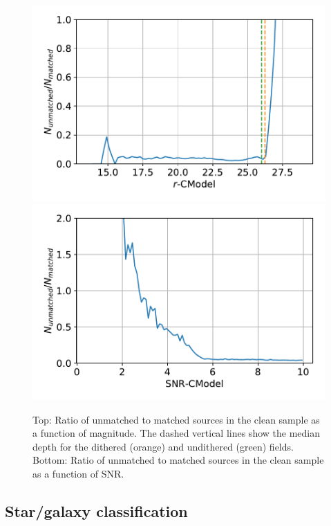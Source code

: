 \documentclass[\docopts]{\docclass}
\begin{document}
\begin{figure}
\centering
\includegraphics[width=0.9\columnwidth]{unmatched_fraction_magnitude.pdf}
\includegraphics[width=0.9\columnwidth]{unmatched_fraction_SNR.pdf}
\caption{Top: Ratio of unmatched to matched sources in the clean sample as a function of magnitude. The dashed vertical lines show the median depth for the dithered (orange) and undithered (green) fields. Bottom: Ratio of unmatched to matched sources in the clean sample as a function of SNR.}
\label{fig:snr_mag_selection}
\end{figure}

\subsection{Star/galaxy classification}
\end{document}
